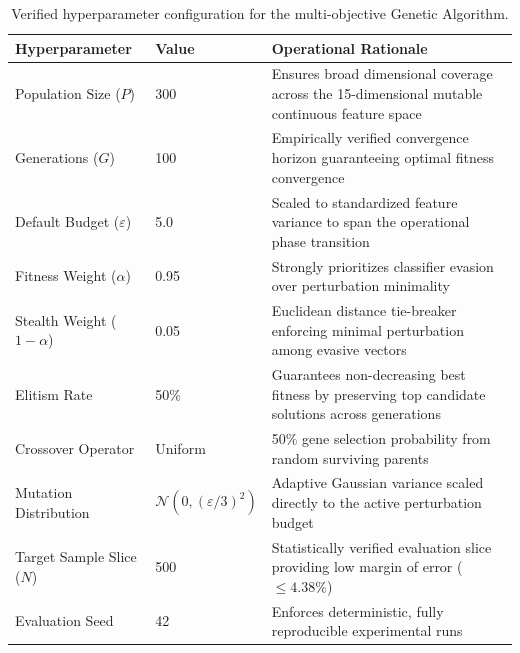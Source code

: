 \documentclass[final,5p,times,twocolumn]{elsarticle}
\begin{document}
\begin{table}[t]
\centering
\small
\caption{Verified hyperparameter configuration for the multi-objective Genetic Algorithm.}
\label{tab:ga_hyperparams}
\begin{tabularx}{\textwidth}{l l X}
\toprule
\textbf{Hyperparameter} & \textbf{Value} & \textbf{Operational Rationale} \\
\midrule
Population Size ($P$) & 300 & Ensures broad dimensional coverage across the 15-dimensional mutable continuous feature space \\
Generations ($G$) & 100 & Empirically verified convergence horizon guaranteeing optimal fitness convergence \\
Default Budget ($\varepsilon$) & 5.0 & Scaled to standardized feature variance to span the operational phase transition \\
Fitness Weight ($\alpha$) & 0.95 & Strongly prioritizes classifier evasion over perturbation minimality \\
Stealth Weight ($1-\alpha$) & 0.05 & Euclidean distance tie-breaker enforcing minimal perturbation among evasive vectors \\
Elitism Rate & 50\% & Guarantees non-decreasing best fitness by preserving top candidate solutions across generations \\
Crossover Operator & Uniform & 50\% gene selection probability from random surviving parents \\
Mutation Distribution & $\mathcal{N}(0, (\varepsilon/3)^2)$ & Adaptive Gaussian variance scaled directly to the active perturbation budget \\
Target Sample Slice ($N$) & 500 & Statistically verified evaluation slice providing low margin of error ($\le 4.38\%$) \\
Evaluation Seed & 42 & Enforces deterministic, fully reproducible experimental runs \\
\bottomrule
\end{tabularx}
\end{table}
\end{document}

